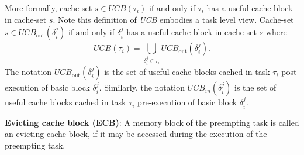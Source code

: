 \noindent More formally, cache-set \begin{math}s \in \textit{UCB}(\tau_{i})\textrm{ if and only if }\tau_{i}\end{math} has a useful cache block in cache-set $s$.  Note this definition of \textit{UCB} embodies a task level view.  Cache-set \begin{math}s \in \textit{UCB}_{\textrm{out}}(\delta_{i}^{j})\textrm{ if and only if }\delta_{i}^{j}\end{math} has a useful cache block in cache-set $s$ where
\begin{equation}\label{eqn:ucb-task}
    \textit{UCB}(\tau_{i}) = \bigcup_{\delta_{i}^{j} \in \tau_{i}} \textit{UCB}_{\textrm{out}}(\delta_{i}^{j}).
\end{equation}
\noindent The notation \begin{math}\textit{UCB}_{\textrm{out}}(\delta_{i}^{j})\end{math} is the set of useful cache blocks cached in task \begin{math}\tau_{i}\end{math} post-execution of basic block \begin{math}\delta_{i}^{j}\end{math}.  Similarly, the notation \begin{math}\textit{UCB}_{in}(\delta_{i}^{j})\end{math} is the set of useful cache blocks cached in task \begin{math}\tau_{i}\end{math} pre-execution of basic block \begin{math}\delta_{i}^{j}\end{math}.

\begin{definition}
\textbf{Evicting cache block (ECB)}: A memory block of the preempting task is called an evicting cache block, if it may be accessed during the execution of the preempting task.
\end{definition}

